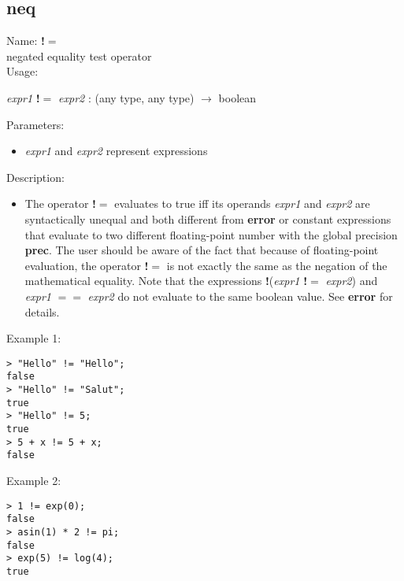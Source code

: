 \subsection{neq}
\label{labneq}
\noindent Name: \textbf{!$=$}\\
negated equality test operator\\

\noindent Usage: 
\begin{center}
\emph{expr1} \textbf{!$=$} \emph{expr2} : (\textsf{any type}, \textsf{any type}) $\rightarrow$ \textsf{boolean}\\
\end{center}
Parameters: 
\begin{itemize}
\item \emph{expr1} and \emph{expr2} represent expressions
\end{itemize}
\noindent Description: \begin{itemize}

\item The operator \textbf{!$=$} evaluates to true iff its operands \emph{expr1} and
   \emph{expr2} are syntactically unequal and both different from \textbf{error} or
   constant expressions that evaluate to two different floating-point
   number with the global precision \textbf{prec}. The user should be aware of
   the fact that because of floating-point evaluation, the operator
   \textbf{!$=$} is not exactly the same as the negation of the mathematical
   equality. 
   Note that the expressions \textbf{!}(\emph{expr1} \textbf{!$=$} \emph{expr2}) and \emph{expr1} \textbf{$==$}
   \emph{expr2} do not evaluate to the same boolean value. See \textbf{error} for
   details.
\end{itemize}
\noindent Example 1: 
\begin{center}\begin{minipage}{15cm}\begin{Verbatim}[frame=single]
> "Hello" != "Hello";
false
> "Hello" != "Salut";
true
> "Hello" != 5;
true
> 5 + x != 5 + x;
false
\end{Verbatim}
\end{minipage}\end{center}
\noindent Example 2: 
\begin{center}\begin{minipage}{15cm}\begin{Verbatim}[frame=single]
> 1 != exp(0);
false
> asin(1) * 2 != pi;
false
> exp(5) != log(4);
true
\end{Verbatim}
\end{minipage}\end{center}
